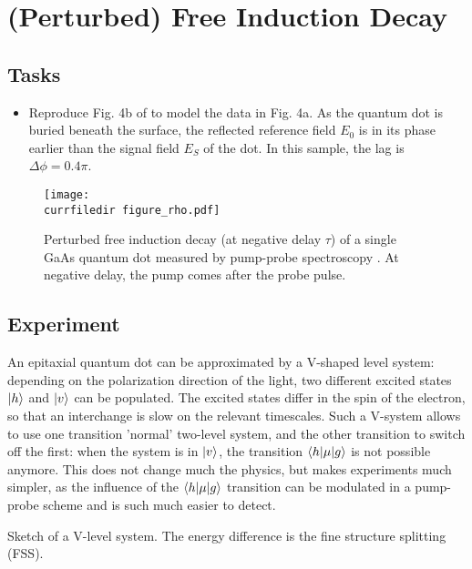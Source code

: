 

\chapter{(Perturbed) Free Induction Decay}



\section{Tasks}

\begin{itemize}
\item Reproduce Fig. 4b of \cite{Wolpert:2012hs} to model the data in Fig. 4a. As the quantum dot is buried beneath the surface, the reflected reference field $E_0$ is in its phase earlier than the signal field $E_S$ of the dot. In this sample, the lag is $\Delta \phi = 0.4 \pi$.
\end{itemize}

\begin{figure}
\centering
\texttt{[image: \\currfiledir figure\_rho.pdf]}
\caption{Perturbed free induction decay (at negative delay $\tau$) of a single GaAs quantum dot measured by pump-probe spectroscopy \citep{Wolpert:2012hs}. At negative delay, the pump comes after the probe pulse.}
\end{figure}

\section{Experiment}

An epitaxial quantum dot can be approximated by a V-shaped level system: depending on the polarization direction of the light, two different excited states $\ket{h}$ and $\ket{v}$
 can be populated. The excited states differ in the spin of the electron, so that an interchange is slow on the relevant timescales. Such a V-system allows to use one transition 'normal' two-level system, and the other transition to switch off the first: when the system is in $\ket{v}$, the transition $\braket{h | \mu | g}$ is not possible anymore. This does not change much the physics, but makes experiments much simpler, as the influence of the  $\braket{h | \mu | g}$ transition can be modulated in a pump-probe scheme and is such much easier to detect.
 
\begin{marginfigure}
\caption{Sketch of a V-level system. The energy difference is the fine structure splitting (FSS).}
\end{marginfigure}


